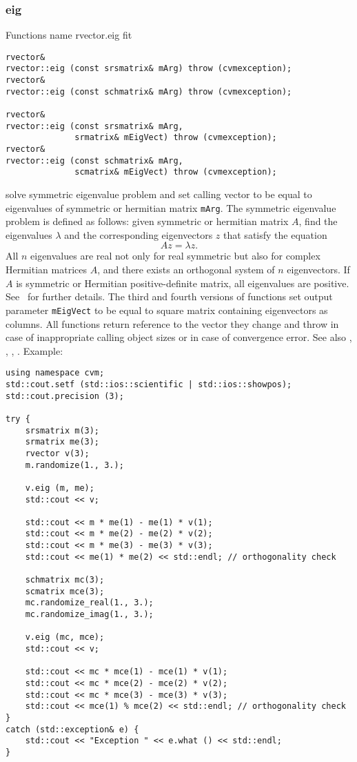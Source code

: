 \subsubsection{eig}
Functions%
\pdfdest name {rvector.eig} fit
\begin{verbatim}
rvector&
rvector::eig (const srsmatrix& mArg) throw (cvmexception);
rvector&
rvector::eig (const schmatrix& mArg) throw (cvmexception);

rvector&
rvector::eig (const srsmatrix& mArg,
              srmatrix& mEigVect) throw (cvmexception);
rvector&
rvector::eig (const schmatrix& mArg,
              scmatrix& mEigVect) throw (cvmexception);
\end{verbatim}
solve symmetric eigenvalue problem and
set calling vector to be equal to eigenvalues
of symmetric
or hermitian matrix \verb"mArg".
The symmetric eigenvalue problem is defined
as follows: given symmetric
or hermitian matrix $A$, find the eigenvalues $\lambda$
and the corresponding
eigenvectors $z$ that satisfy the equation
\begin{equation*}
Az = \lambda z.
\end{equation*}
All $n$ eigenvalues are real not only for real
symmetric but also for complex Hermitian matrices $A$,
and there exists an
orthogonal system of $n$ eigenvectors.
If $A$ is  symmetric or Hermitian
positive-definite matrix, all eigenvalues are positive.
See~ for further details.
The third and fourth versions of  functions
set  output parameter \verb"mEigVect" to be equal
to  square matrix containing eigenvectors as columns.
All  functions
return  reference to the vector they change and throw
in case of inappropriate calling object sizes
or in case of convergence error.
See also
, ,
, .
Example:
\begin{Verbatim}
using namespace cvm;
std::cout.setf (std::ios::scientific | std::ios::showpos);
std::cout.precision (3);

try {
    srsmatrix m(3);
    srmatrix me(3);
    rvector v(3);
    m.randomize(1., 3.);

    v.eig (m, me);
    std::cout << v;

    std::cout << m * me(1) - me(1) * v(1);
    std::cout << m * me(2) - me(2) * v(2);
    std::cout << m * me(3) - me(3) * v(3);
    std::cout << me(1) * me(2) << std::endl; // orthogonality check

    schmatrix mc(3);
    scmatrix mce(3);
    mc.randomize_real(1., 3.);
    mc.randomize_imag(1., 3.);

    v.eig (mc, mce);
    std::cout << v;

    std::cout << mc * mce(1) - mce(1) * v(1);
    std::cout << mc * mce(2) - mce(2) * v(2);
    std::cout << mc * mce(3) - mce(3) * v(3);
    std::cout << mce(1) % mce(2) << std::endl; // orthogonality check
}
catch (std::exception& e) {
    std::cout << "Exception " << e.what () << std::endl;
}
\end{Verbatim}
